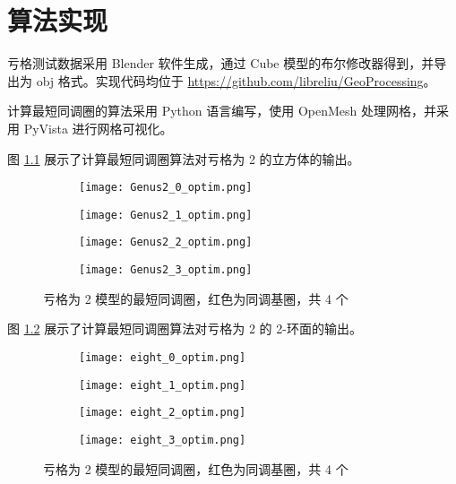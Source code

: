 
\chapter{算法实现}

亏格测试数据采用 Blender 软件生成，通过 Cube 模型的布尔修改器得到，并导出为 obj 格式。实现代码均位于 \url{https://github.com/libreliu/GeoProcessing}。

计算最短同调圈的算法采用 Python 语言编写，使用 OpenMesh 处理网格，并采用 PyVista 进行网格可视化。

图 \ref{fig:genus2him} 展示了计算最短同调圈算法对亏格为 2 的立方体的输出。

\begin{figure}[h]
    \centering
    \begin{subfigure}{.2\textwidth}
        \centering
        \texttt{[image: Genus2\_0\_optim.png]}
    \end{subfigure}
    \begin{subfigure}{.2\textwidth}
        \centering
        \texttt{[image: Genus2\_1\_optim.png]}
    \end{subfigure}
    \begin{subfigure}{.2\textwidth}
        \centering
        \texttt{[image: Genus2\_2\_optim.png]}
    \end{subfigure}
    \begin{subfigure}{.2\textwidth}
        \centering
        \texttt{[image: Genus2\_3\_optim.png]}
    \end{subfigure}
    \caption{亏格为 2 模型的最短同调圈，红色为同调基圈，共 4 个}
    \label{fig:genus2him}
\end{figure}

图 \ref{fig:eighthim} 展示了计算最短同调圈算法对亏格为 2 的 2-环面的输出。

\begin{figure}[h]
    \centering
    \begin{subfigure}{.2\textwidth}
        \centering
        \texttt{[image: eight\_0\_optim.png]}
    \end{subfigure}
    \begin{subfigure}{.2\textwidth}
        \centering
        \texttt{[image: eight\_1\_optim.png]}
    \end{subfigure}
    \begin{subfigure}{.2\textwidth}
        \centering
        \texttt{[image: eight\_2\_optim.png]}
    \end{subfigure}
    \begin{subfigure}{.2\textwidth}
        \centering
        \texttt{[image: eight\_3\_optim.png]}
    \end{subfigure}
    \caption{亏格为 2 模型的最短同调圈，红色为同调基圈，共 4 个}
    \label{fig:eighthim}
\end{figure}

